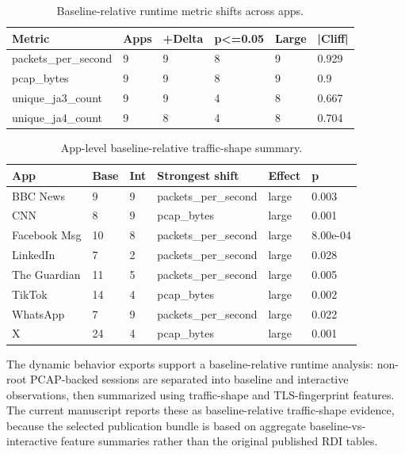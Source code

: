 
\begin{table}[t]
\centering
\caption{Baseline-relative runtime metric shifts across apps.}
\label{tab:dynamic_metric_shifts}
\small
\begin{tabular}{llllll}
\hline
Metric & Apps & +Delta & p<=0.05 & Large & |Cliff| \\
\hline
packets\_per\_second & 9 & 9 & 8 & 9 & 0.929 \\
pcap\_bytes & 9 & 9 & 8 & 9 & 0.9 \\
unique\_ja3\_count & 9 & 9 & 4 & 8 & 0.667 \\
unique\_ja4\_count & 9 & 8 & 4 & 8 & 0.704 \\
\hline
\end{tabular}
\end{table}


\begin{table}[t]
\centering
\caption{App-level baseline-relative traffic-shape summary.}
\label{tab:baseline_relative_traffic_shape}
\small
\begin{tabular}{llllll}
\hline
App & Base & Int & Strongest shift & Effect & p \\
\hline
BBC News & 9 & 9 & packets\_per\_second & large & 0.003 \\
CNN & 8 & 9 & pcap\_bytes & large & 0.001 \\
Facebook Msg & 10 & 8 & packets\_per\_second & large & 8.00e-04 \\
LinkedIn & 7 & 2 & packets\_per\_second & large & 0.028 \\
The Guardian & 11 & 5 & packets\_per\_second & large & 0.005 \\
TikTok & 14 & 4 & pcap\_bytes & large & 0.002 \\
WhatsApp & 7 & 9 & packets\_per\_second & large & 0.022 \\
X & 24 & 4 & pcap\_bytes & large & 0.001 \\
\hline
\end{tabular}
\end{table}


The dynamic behavior exports support a baseline-relative runtime analysis: non-root PCAP-backed sessions are separated into baseline and interactive observations, then summarized using traffic-shape and TLS-fingerprint features. The current manuscript reports these as baseline-relative traffic-shape evidence, because the selected publication bundle is based on aggregate baseline-vs-interactive feature summaries rather than the original published RDI tables.
